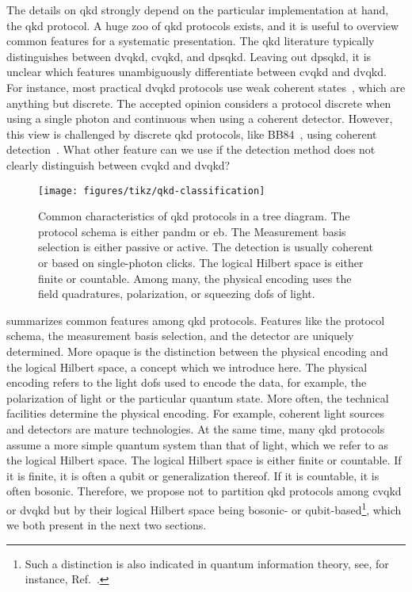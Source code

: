 The details on \gls{qkd} strongly depend on the particular implementation at hand, the \gls{qkd} protocol.
A huge zoo of \gls{qkd} protocols exists, and it is useful to overview common features for a systematic presentation.
The \gls{qkd} literature typically distinguishes between \gls{dvqkd}, \gls{cvqkd}, and \gls{dpsqkd}.
Leaving out \gls{dpsqkd}, it is unclear which features unambiguously differentiate between \gls{cvqkd} and \gls{dvqkd}.
For instance, most practical \gls{dvqkd} protocols use weak coherent states~\cite{Duvsek2006}, which are anything but discrete.
The accepted opinion considers a protocol discrete when using a single photon and continuous when using a coherent detector.
However, this view is challenged by discrete \gls{qkd} protocols, like BB84~\cite{Bennett1984}, using coherent detection~\cite{Qi2021}.
What other feature can we use if the detection method does not clearly distinguish between \gls{cvqkd} and \gls{dvqkd}?
\begin{figure}[htb]
	\centering
	\texttt{[image: figures/tikz/qkd-classification]}
	\caption{Common characteristics of \gls{qkd} protocols in a tree diagram. The protocol schema is either \gls{pandm} or \gls{eb}. The Measurement basis selection is either passive or active. The detection is usually coherent or based on single-photon clicks. The logical Hilbert space is either finite or countable. Among many, the physical encoding uses the field quadratures, polarization, or squeezing \glspl{dof} of light.}\label{fig:qkd_classification}
\end{figure}
 summarizes common features among \gls{qkd} protocols.
Features like the protocol schema, the measurement basis selection, and the detector are uniquely determined.
More opaque is the distinction between the physical encoding and the logical Hilbert space, a concept which we introduce here.
The physical encoding refers to the light \glspl{dof} used to encode the data, for example, the polarization of light or the particular quantum state.
More often, the technical facilities determine the physical encoding.
For example, coherent light sources and detectors are mature technologies.
At the same time, many \gls{qkd} protocols assume a more simple quantum system than that of light, which we refer to as the logical Hilbert space.
The logical Hilbert space is either finite or countable.
If it is finite, it is often a qubit or generalization thereof.
If it is countable, it is often bosonic.
Therefore, we propose not to partition \gls{qkd} protocols among \gls{cvqkd} or \gls{dvqkd} but by their logical Hilbert space being bosonic- or qubit-based\footnote{Such a distinction is also indicated in quantum information theory, see, for instance, Ref.~\cite[p.~2]{Weedbrook2012}.}, which we both present in the next two sections.